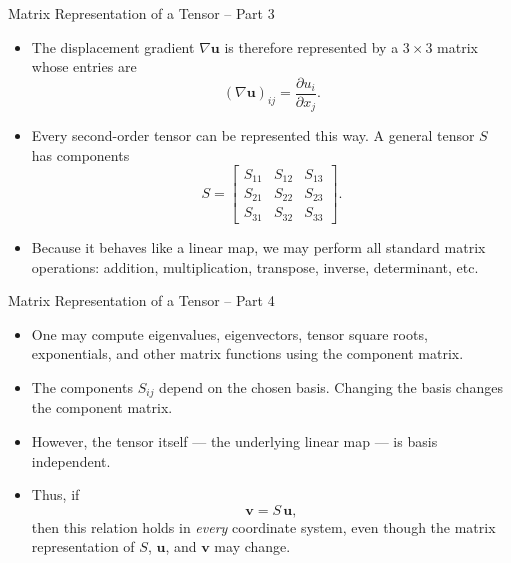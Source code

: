 \documentclass{beamer}
\begin{document}
\begin{frame}{Matrix Representation of a Tensor -- Part 3}

\begin{itemize}

\item The displacement gradient \(\nabla \mathbf{u}\) is therefore represented by
a \(3\times 3\) matrix whose entries are
\[
(\nabla \mathbf{u})_{ij} = \frac{\partial u_i}{\partial x_j}.
\]

\item Every second-order tensor can be represented this way.  
A general tensor \(S\) has components
\[
S =
\begin{bmatrix}
S_{11} & S_{12} & S_{13} \\
S_{21} & S_{22} & S_{23} \\
S_{31} & S_{32} & S_{33}
\end{bmatrix}.
\]

\item Because it behaves like a linear map, we may perform all standard
matrix operations: addition, multiplication, transpose, inverse, determinant, etc.

\end{itemize}

\end{frame}


\begin{frame}{Matrix Representation of a Tensor -- Part 4}

\begin{itemize}

\item One may compute eigenvalues, eigenvectors, tensor square roots, exponentials,
and other matrix functions using the component matrix.

\item The components \(S_{ij}\) depend on the chosen basis.  
Changing the basis changes the component matrix.

\item However, the tensor itself --- the underlying linear map --- is basis independent.

\item Thus, if
\[
\mathbf{v} = S\,\mathbf{u},
\]
then this relation holds in \emph{every} coordinate system, even though the
matrix representation of \(S\), \(\mathbf{u}\), and \(\mathbf{v}\) may change.

\end{itemize}

\end{frame}
\end{document}
